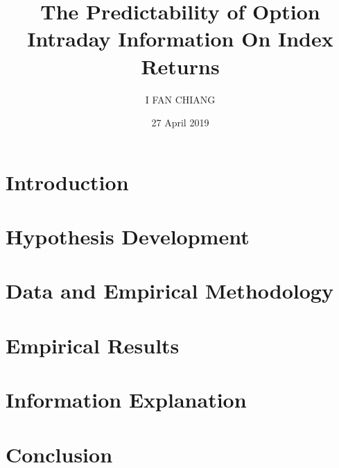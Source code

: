 \documentclass[oneside,12pt]{article}
\title{\textbf{The Predictability of Option Intraday Information On Index Returns}}
\author{I FAN CHIANG}
\date{27 April 2019}
\begin{document}
\maketitle

\newpage



\newpage
\begin{abstract}
\centering

\end{abstract}

\newpage
\begin{abstract}
\centering

\end{abstract}

\newpage
\tableofcontents
\newpage
\listoftables


\newpage
\fontsize{13pt}{18pt}\selectfont
\section{Introduction}\label{ch:Introduction}



\fontsize{13pt}{18pt}\selectfont
\section{Hypothesis Development}\label{ch:Hypothesis}


\fontsize{13pt}{18pt}\selectfont
\section{Data and Empirical Methodology}\label{ch:method}


\fontsize{13pt}{18pt}\selectfont
\section{Empirical Results}\label{ch:results}



\fontsize{13pt}{18pt}\selectfont
\section{Information Explanation}\label{ch:info}



\fontsize{13pt}{18pt}\selectfont
\section{Conclusion}\label{ch:conclusion}





\newpage
\printbibliography
\end{document}
